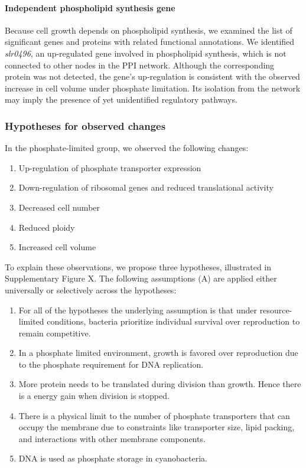 \paragraph{Independent phospholipid synthesis
gene}\label{independent-phospholipid-synthesis-gene}

Because cell growth depends on phospholipid synthesis, we examined the
list of significant genes and proteins with related functional
annotations. We identified \emph{slr0496}, an up-regulated gene involved
in phospholipid synthesis, which is not connected to other nodes in the
PPI network. Although the corresponding protein was not detected, the
gene's up-regulation is consistent with the observed increase in cell
volume under phosphate limitation. Its isolation from the network may
imply the presence of yet unidentified regulatory pathways.

\subsubsection{Hypotheses for observed
changes}\label{hypotheses-for-observed-changes}

In the phosphate-limited group, we observed the following changes:

\begin{enumerate}
\def\labelenumi{\arabic{enumi}.}
\tightlist
\item
  Up-regulation of phosphate transporter expression
\item
  Down-regulation of ribosomal genes and reduced translational activity
\item
  Decreased cell number
\item
  Reduced ploidy
\item
  Increased cell volume
\end{enumerate}

To explain these observations, we propose three hypotheses, illustrated
in Supplementary Figure X. The following assumptions (A) are applied
either universally or selectively across the hypotheses:

\begin{enumerate}
\def\labelenumi{\arabic{enumi}.}
\tightlist
\item
  For all of the hypotheses the underlying assumption is that under
  resource-limited conditions, bacteria prioritize individual survival
  over reproduction to remain competitive.
\item
  In a phosphate limited environment, growth is favored over
  reproduction due to the phosphate requirement for DNA replication.
\item
  More protein needs to be translated during division than growth. Hence
  there is a energy gain when division is stopped.
\item
  There is a physical limit to the number of phosphate transporters that
  can occupy the membrane due to constraints like transporter size,
  lipid packing, and interactions with other membrane components.
\item
  DNA is used as phosphate storage in cyanobacteria.
\end{enumerate}

